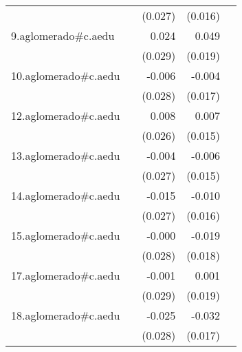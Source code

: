 {\begin{longtable}{l*{4}{D{.}{.}{-1}}}
            &                     &     (0.027)         &     (0.016)         &                     \\
\addlinespace
9.aglomerado#c.aedu&                     &       0.024         &       0.049\sym{*}  &                     \\
            &                     &     (0.029)         &     (0.019)         &                     \\
\addlinespace
10.aglomerado#c.aedu&                     &      -0.006         &      -0.004         &                     \\
            &                     &     (0.028)         &     (0.017)         &                     \\
\addlinespace
12.aglomerado#c.aedu&                     &       0.008         &       0.007         &                     \\
            &                     &     (0.026)         &     (0.015)         &                     \\
\addlinespace
13.aglomerado#c.aedu&                     &      -0.004         &      -0.006         &                     \\
            &                     &     (0.027)         &     (0.015)         &                     \\
\addlinespace
14.aglomerado#c.aedu&                     &      -0.015         &      -0.010         &                     \\
            &                     &     (0.027)         &     (0.016)         &                     \\
\addlinespace
15.aglomerado#c.aedu&                     &      -0.000         &      -0.019         &                     \\
            &                     &     (0.028)         &     (0.018)         &                     \\
\addlinespace
17.aglomerado#c.aedu&                     &      -0.001         &       0.001         &                     \\
            &                     &     (0.029)         &     (0.019)         &                     \\
\addlinespace
18.aglomerado#c.aedu&                     &      -0.025         &      -0.032         &                     \\
            &                     &     (0.028)         &     (0.017)         &                     \\

\end{longtable}}
